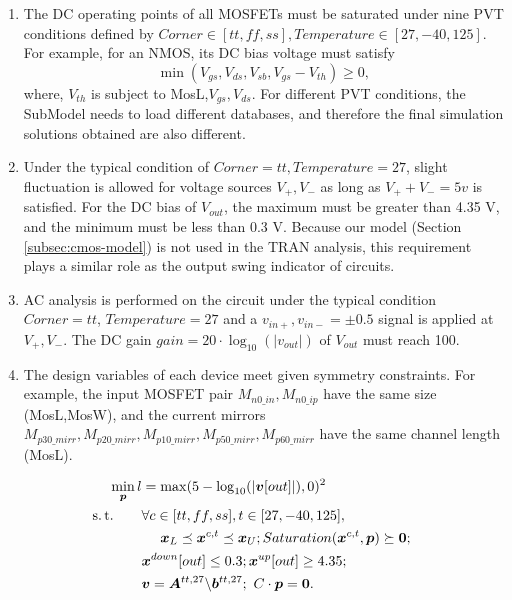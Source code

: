 \begin{enumerate}[partopsep=0pt,topsep=0pt,itemsep=0pt,parsep=0pt]
  \item The DC operating points of all MOSFETs must be saturated under nine PVT conditions defined by $Corner\in[tt,ff,ss],Temperature\in[27,-40,125]$. For example, for an NMOS, its DC bias voltage must satisfy
    \[
      \min(V_{gs},V_{ds},V_{sb},V_{gs}-V_{th})\geq0,
    \]
    where, $V_{th}$ is subject to MosL,$V_{gs},V_{ds}$. For different PVT conditions, the SubModel needs to load different databases, and therefore the final simulation solutions obtained are also different.
  \item Under the typical condition of $Corner=tt,Temperature=27$, slight fluctuation is allowed for voltage sources $V_+,V_-$ as long as $V_++V_-=5v$ is satisfied. For the DC bias of $V_{out}$, the maximum must be greater than 4.35 V, and the minimum must be less than 0.3 V.
    Because our model (Section \ref{subsec:cmos-model}) is not used in the TRAN analysis, this requirement plays a similar role as the output swing indicator of circuits.
  \item AC analysis is performed on the circuit under the typical condition $Corner=tt$, $Temperature=27$ and a $v_{in+},v_{in-}=\pm0.5$ signal is applied at $V_+,V_-$. The DC gain $gain=20\cdot\log_{10}(|v_{out}|)$ of $V_{out}$ must reach 100.
  \item The design variables of each device meet given symmetry constraints. For example, the input MOSFET pair $M_{n0\_in},M_{n0\_ip}$ have the same size (MosL,MosW), and the current mirrors $M_{p30\_mirr},M_{p20\_mirr},M_{p10\_mirr},M_{p50\_mirr},M_{p60\_mirr}$ have the same channel length (MosL).
\end{enumerate}
\begin{equation}\label{eq:optimization}
  \begin{split}
    \min_{\bm{p}} l &= \max(5-\log_{10}(|\bm{v}[out]|),0)^2 \\
    \st \ \ \ \ \ \ 
    & \forall c\in[tt,ff,ss],t\in[27,-40,125], \\
    & \ \ \ \ \bm{x}_L\preceq\bm{x}^{c,t}\preceq\bm{x}_U;
    Saturation(\bm{x}^{c,t},\bm{p})\succeq\bm{0}; \\
    & \bm{x}^{down}[out]\leq0.3;\bm{x}^{up}[out]\geq4.35; \\
    & \bm{v}=\bm{A}^{tt,27}\backslash\bm{b}^{tt,27}; \ C\cdot\bm{p}=\bm{0}.
  \end{split}
\end{equation}
